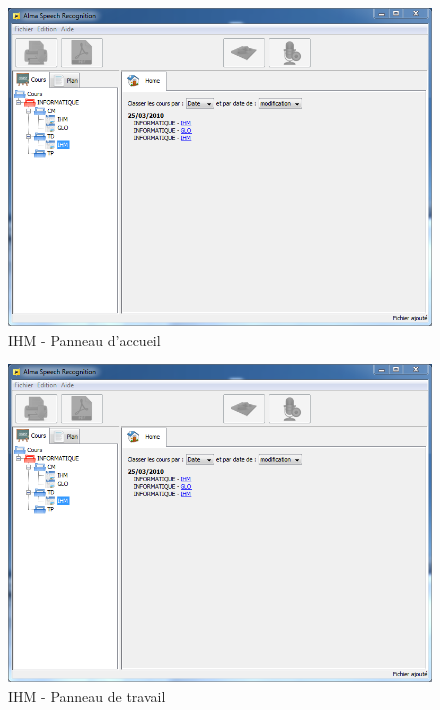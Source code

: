 \begin{figure}[h]
 \centering
 \includegraphics[scale=0.6]{./images/homePanel.png}
 \caption{IHM - Panneau d'accueil}
 \label{fig:homePanel}
\end{figure}



\begin{figure}[h]
 \centering
 \includegraphics[scale=0.6]{./images/homePanel.png}
 \caption{IHM - Panneau de travail}
 \label{fig:homePanel}
\end{figure}
